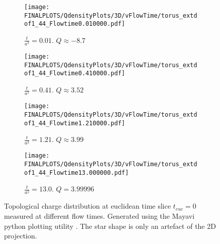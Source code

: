 \documentclass[a4paper,10pt]{book}
\begin{document}
\begin{figure}[htbp]
\centering
\begin{subfigure}{0.5\textwidth}
\centering
\texttt{[image: FINALPLOTS/QdensityPlots/3D/vFlowTime/torus\_extdof1\_44\_Flowtime0.010000.pdf]}
\caption{$\frac{t}{a^2} = 0.01$. $Q \approx -8.7 $}\label{fig:Qdensdist1}
\end{subfigure}%
\begin{subfigure}{0.5\textwidth}
\centering
\texttt{[image: FINALPLOTS/QdensityPlots/3D/vFlowTime/torus\_extdof1\_44\_Flowtime0.410000.pdf]}
\caption{$\frac{t}{a^2} = 0.41$. $Q \approx 3.52 $}\label{fig:Qdensdist2}
\end{subfigure}
\begin{subfigure}{0.5\textwidth}
\centering
\texttt{[image: FINALPLOTS/QdensityPlots/3D/vFlowTime/torus\_extdof1\_44\_Flowtime1.210000.pdf]}
\label{fig:Qdensdist3}
\caption{$\frac{t}{a^2} = 1.21$. $Q \approx 3.99 $}
\end{subfigure}%
\begin{subfigure}{0.5\textwidth}
\centering
\texttt{[image: FINALPLOTS/QdensityPlots/3D/vFlowTime/torus\_extdof1\_44\_Flowtime13.000000.pdf]}
\label{fig:Qdensdist4}
\caption{$\frac{t}{a^2} = 13.0$. $Q = 3.99996$}
\end{subfigure}
\caption[]{Topological charge distribution at euclidean time slice $t_{euc}=0$ measured at different flow times. Generated using the Mayavi python plotting utility \cite{ramachandran2011mayavi}. The star shape is only an artefact of the 2D projection.}
\label{fig:Qdensdist_all}
\end{figure}


\FloatBarrier
\end{document}
